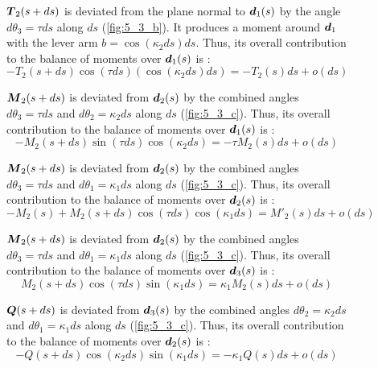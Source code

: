 \begin{figure}[p]
\begin{fullpage}
	$\boldsymbol{T}_2(s+ds)$ is deviated from the plane normal to $\boldsymbol{d}_1(s)$ by the angle $d\theta_3 = \tau ds$ along $ds$ (\cref{fig:5_3_b}). It produces a moment around $\boldsymbol{d}_1$ with the lever arm $b =  \cos(\kappa_2 ds) ds$. Thus, its overall contribution to the balance of moments over $\boldsymbol{d}_1(s)$ is : 
	\begin{equation*}
		-T_2(s+ds) \cos(\tau ds) (\cos(\kappa_2 ds) ds) = -T_2(s) ds + o(ds)
	\end{equation*}
	
	$\boldsymbol{M}_2(s+ds)$ is deviated from $\boldsymbol{d}_2(s)$ by the combined angles $d\theta_3 = \tau ds$ and $d\theta_2 = \kappa_2 ds$ along $ds$ (\cref{fig:5_3_c}). Thus, its overall contribution to the balance of moments over $\boldsymbol{d}_1(s)$ is : 
	\begin{equation*}
		-M_2(s+ds) \sin(\tau ds) \cos(\kappa_2 ds) = -\tau M_2 (s) ds + o(ds)
	\end{equation*}	
	
	$\boldsymbol{M}_2(s+ds)$ is deviated from $\boldsymbol{d}_2(s)$ by the combined angles $d\theta_3 = \tau ds$ and $d\theta_1 = \kappa_1 ds$ along $ds$ (\cref{fig:5_3_c}). Thus, its overall contribution to the balance of moments over $\boldsymbol{d}_2(s)$ is : 
	\begin{equation*}
		-M_2(s) + M_2(s+ds) \cos(\tau ds) \cos(\kappa_1 ds) = M'_2 (s) ds + o(ds)
	\end{equation*}
	
	$\boldsymbol{M}_2(s+ds)$ is deviated from $\boldsymbol{d}_2(s)$ by the combined angles $d\theta_3 = \tau ds$ and $d\theta_1 = \kappa_1 ds$ along $ds$ (\cref{fig:5_3_c}). Thus, its overall contribution to the balance of moments over $\boldsymbol{d}_3(s)$ is : 
	\begin{equation*}
		M_2(s+ds) \cos(\tau ds) \sin(\kappa_1 ds) = \kappa_1 M_2 (s) ds + o(ds)
	\end{equation*}	
	
	$\boldsymbol{Q}(s+ds)$ is deviated from $\boldsymbol{d}_3(s)$ by the combined angles $d\theta_2 = \kappa_2 ds$ and $d\theta_1 = \kappa_1 ds$ along $ds$ (\cref{fig:5_3_c}). Thus, its overall contribution to the balance of moments over $\boldsymbol{d}_2(s)$ is : 
	\begin{equation*}
		-Q(s+ds) \cos(\kappa_2 ds) \sin(\kappa_1 ds) = -\kappa_1 Q(s) ds + o(ds)
	\end{equation*}	
	  \end{fullpage}
\end{figure}

 

